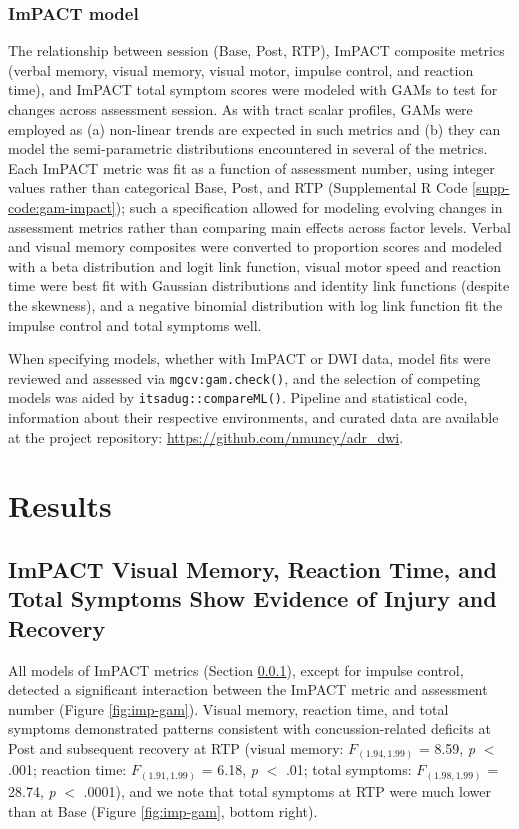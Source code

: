 \documentclass[12pt]{article}
\begin{document}
\subsubsection{ImPACT model}
\label{sssec:meth-gam-impact}
The relationship between session (Base, Post, RTP), ImPACT composite metrics (verbal memory, visual memory, visual motor, impulse control, and reaction time), and ImPACT total symptom scores were modeled with GAMs to test for changes across assessment session. As with tract scalar profiles, GAMs were employed as (a) non-linear trends are expected in such metrics and (b) they can model the semi-parametric distributions encountered in several of the metrics. Each ImPACT metric was fit as a function of assessment number, using integer values rather than categorical Base, Post, and RTP (Supplemental R Code \ref{supp-code:gam-impact}); such a specification allowed for modeling evolving changes in assessment metrics rather than comparing main effects across factor levels. Verbal and visual memory composites were converted to proportion scores and modeled with a beta distribution and logit link function, visual motor speed and reaction time were best fit with Gaussian distributions and identity link functions (despite the skewness), and a negative binomial distribution with log link function fit the impulse control and total symptoms well.

When specifying models, whether with ImPACT or DWI data, model fits were reviewed and assessed via \lstinline{mgcv:gam.check()}, and the selection of competing models was aided by \lstinline{itsadug::compareML()}. Pipeline and statistical code, information about their respective environments, and curated data are available at the project repository: \url{https://github.com/nmuncy/adr_dwi}.


\section{Results}
\label{sec:res}

\subsection{ImPACT Visual Memory, Reaction Time, and Total Symptoms Show Evidence of Injury and Recovery}
\label{ssec:res-imp}
All models of ImPACT metrics (Section \ref{sssec:meth-gam-impact}), except for impulse control, detected a significant interaction between the ImPACT metric and assessment number (Figure \ref{fig:imp-gam}). Visual memory, reaction time, and total symptoms demonstrated patterns consistent with concussion-related deficits at Post and subsequent recovery at RTP (visual memory: $F_{(1.94, 1.99)}$ = 8.59, \textit{p} $<$ .001; reaction time: $F_{(1.91, 1.99)}$ = 6.18, \textit{p} $<$ .01; total symptoms: $F_{(1.98, 1.99)}$ = 28.74, \textit{p} $<$ .0001), and we note that total symptoms at RTP were much lower than at Base (Figure \ref{fig:imp-gam}, bottom right).
\end{document}
